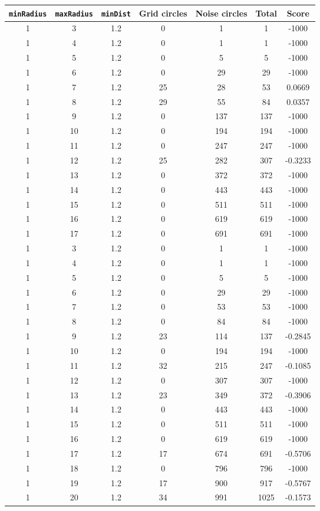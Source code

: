 \documentclass[letterpaper, 12pt]{article}
\begin{document}
\begin{longtable}{|c|c|c|c|c|c|c|}
\hline
\textbf{\texttt{minRadius}} & \textbf{\texttt{maxRadius}} & \textbf{\texttt{minDist}} & \textbf{Grid circles} & \textbf{Noise circles} & \textbf{Total} & \textbf{Score} \\
\hline
1 & 3 & 1.2 & 0 & 1 & 1 & -1000 \\
\hline
1 & 4 & 1.2 & 0 & 1 & 1 & -1000 \\
\hline
1 & 5 & 1.2 & 0 & 5 & 5 & -1000 \\
\hline
1 & 6 & 1.2 & 0 & 29 & 29 & -1000 \\
\hline
1 & 7 & 1.2 & 25 & 28 & 53 & 0.0669 \\
\hline
1 & 8 & 1.2 & 29 & 55 & 84 & 0.0357 \\
\hline
1 & 9 & 1.2 & 0 & 137 & 137 & -1000 \\
\hline
1 & 10 & 1.2 & 0 & 194 & 194 & -1000 \\
\hline
1 & 11 & 1.2 & 0 & 247 & 247 & -1000 \\
\hline
1 & 12 & 1.2 & 25 & 282 & 307 & -0.3233 \\
\hline
1 & 13 & 1.2 & 0 & 372 & 372 & -1000 \\
\hline
1 & 14 & 1.2 & 0 & 443 & 443 & -1000 \\
\hline
1 & 15 & 1.2 & 0 & 511 & 511 & -1000 \\
\hline
1 & 16 & 1.2 & 0 & 619 & 619 & -1000 \\
\hline
1 & 17 & 1.2 & 0 & 691 & 691 & -1000 \\
\hline
1 & 3 & 1.2 & 0 & 1 & 1 & -1000 \\
\hline
1 & 4 & 1.2 & 0 & 1 & 1 & -1000 \\
\hline
1 & 5 & 1.2 & 0 & 5 & 5 & -1000 \\
\hline
1 & 6 & 1.2 & 0 & 29 & 29 & -1000 \\
\hline
1 & 7 & 1.2 & 0 & 53 & 53 & -1000 \\
\hline
1 & 8 & 1.2 & 0 & 84 & 84 & -1000 \\
\hline
1 & 9 & 1.2 & 23 & 114 & 137 & -0.2845 \\
\hline
1 & 10 & 1.2 & 0 & 194 & 194 & -1000 \\
\hline
1 & 11 & 1.2 & 32 & 215 & 247 & -0.1085 \\
\hline
1 & 12 & 1.2 & 0 & 307 & 307 & -1000 \\
\hline
1 & 13 & 1.2 & 23 & 349 & 372 & -0.3906 \\
\hline
1 & 14 & 1.2 & 0 & 443 & 443 & -1000 \\
\hline
1 & 15 & 1.2 & 0 & 511 & 511 & -1000 \\
\hline
1 & 16 & 1.2 & 0 & 619 & 619 & -1000 \\
\hline
1 & 17 & 1.2 & 17 & 674 & 691 & -0.5706 \\
\hline
1 & 18 & 1.2 & 0 & 796 & 796 & -1000 \\
\hline
1 & 19 & 1.2 & 17 & 900 & 917 & -0.5767 \\
\hline
1 & 20 & 1.2 & 34 & 991 & 1025 & -0.1573 \\
\hline
\end{longtable}
\end{document}

